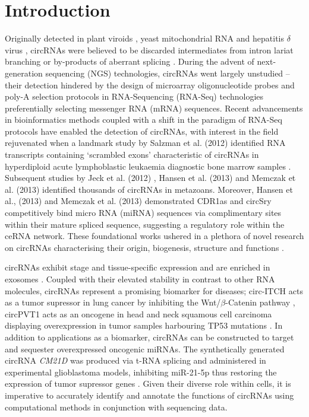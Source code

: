\documentclass[journal,review,submit,pdftex,moreauthors]{Definitions/mdpi}
\begin{document}

\section{Introduction}
\noindent Originally detected in plant viroids \cite{Sanger1976}, yeast mitochondrial RNA \cite{Arnberg1980Feb} and hepatitis $\delta$ virus \cite{Kos1986Oct}, circRNAs were believed to be discarded intermediates from intron lariat branching or by-products of aberrant splicing \cite{Cocquerelle1993Jan, Qian1992}. During the advent of next-generation sequencing (NGS) technologies, circRNAs went largely unstudied -- their detection hindered by the design of microarray oligonucleotide probes and poly-A selection protocols in RNA-Sequencing (RNA-Seq) technologies preferentially selecting messenger RNA (mRNA) sequences. Recent advancements in bioinformatics methods coupled with a shift in the paradigm of RNA-Seq protocols have enabled the detection of circRNAs, with interest in the field rejuvenated when a landmark study by Salzman et al. (2012) identified RNA transcripts containing `scrambled exons' characteristic of circRNAs in hyperdiploid acute lymphoblastic leukaemia diagnostic bone marrow samples \cite{Salzman2012}. Subsequent studies by Jeck et al. (2012) \cite{Jeck2012Dec}, Hansen et al. (2013) \cite{Hansen2013Mar} and Memczak et al. (2013) \cite{find_circ} identified thousands of circRNAs in metazoans. Moreover, Hansen et al., (2013) \cite{Hansen2013Mar} and Memczak et al. (2013) \cite{find_circ} demonstrated CDR1as and circSry competitively bind micro RNA (miRNA) sequences via complimentary sites within their mature spliced sequence, suggesting a regulatory role within the ceRNA network. These foundational works ushered in a plethora of novel research on circRNAs characterising their origin, biogenesis, structure and functions \cite{Danan2012Apr, Jeck2014May, Ashwal-Fluss2014Oct, Chen2015Apr}. \par
circRNAs exhibit stage and tissue-specific expression \cite{circRNA_finder, Gruner2016, Rybak-Wolf2015Jun} and are enriched in exosomes \cite{Li2015Apr}. Coupled with their elevated stability in contrast to other RNA molecules, circRNAs represent a promising biomarker for diseases; circ-ITCH acts as a tumor supressor in lung cancer by inhibiting the Wnt/$\beta$-Catenin pathway \cite{Wan2016}, circPVT1 acts as an oncogene in head and neck squamous cell carcinoma displaying overexpression in tumor samples harbouring TP53 mutations \cite{Verduci2017Dec}. In addition to applications as a biomarker, circRNAs can be constructed to target and sequester overexpressed oncogenic miRNAs. The synthetically generated circRNA \textit{CM21D} was produced via t-RNA splicing and administered in experimental glioblastoma models, inhibiting miR-21-5p thus restoring the expression of tumor supressor genes \cite{Bayat2023Jun}. Given their diverse role within cells, it is imperative to accurately identify and annotate the functions of circRNAs using computational methods in conjunction with sequencing data. \par 
\end{document}
